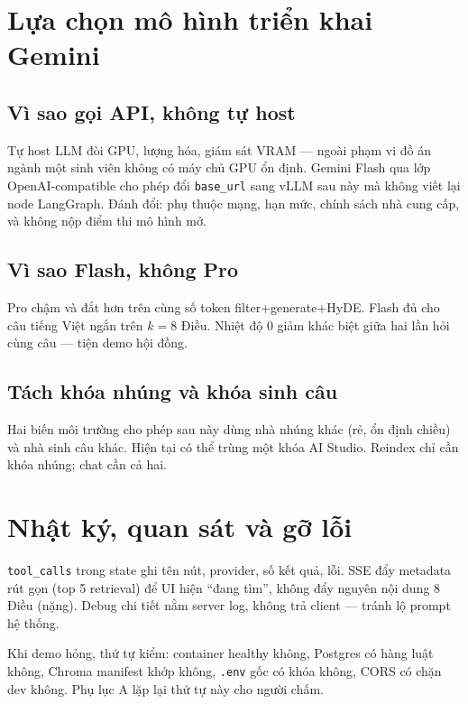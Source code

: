 \section{Lựa chọn mô hình triển khai Gemini}

\subsection{Vì sao gọi API, không tự host}

Tự host LLM đòi GPU, lượng hóa, giám sát VRAM --- ngoài phạm vi đồ án ngành một
sinh viên không có máy chủ GPU ổn định. Gemini Flash qua lớp OpenAI-compatible
cho phép đổi \texttt{base\_url} sang vLLM sau này mà không viết lại node
LangGraph. Đánh đổi: phụ thuộc mạng, hạn mức, chính sách nhà cung cấp, và không
nộp điểm thi mô hình mở.

\subsection{Vì sao Flash, không Pro}

Pro chậm và đắt hơn trên cùng số token filter+generate+HyDE. Flash đủ cho câu
tiếng Việt ngắn trên $k=8$ Điều. Nhiệt độ 0 giảm khác biệt giữa hai lần hỏi
cùng câu --- tiện demo hội đồng.

\subsection{Tách khóa nhúng và khóa sinh câu}

Hai biến môi trường cho phép sau này dùng nhà nhúng khác (rẻ, ổn định chiều)
và nhà sinh câu khác. Hiện tại có thể trùng một khóa AI Studio. Reindex chỉ cần
khóa nhúng; chat cần cả hai.

\section{Nhật ký, quan sát và gỡ lỗi}

\texttt{tool\_calls} trong state ghi tên nút, provider, số kết quả, lỗi. SSE đẩy
metadata rút gọn (top 5 retrieval) để UI hiện ``đang tìm'', không đẩy nguyên
nội dung 8 Điều (nặng). Debug chi tiết nằm server log, không trả client --- tránh
lộ prompt hệ thống.

Khi demo hỏng, thứ tự kiểm: container healthy không, Postgres có hàng luật
không, Chroma manifest khớp không, \texttt{.env} gốc có khóa không, CORS có
chặn dev không. Phụ lục A lặp lại thứ tự này cho người chấm.

